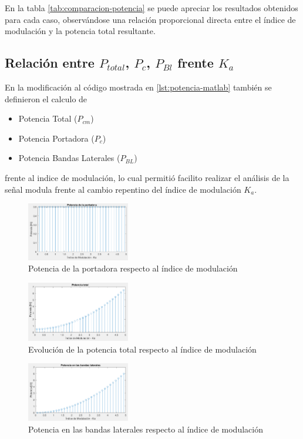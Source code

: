 \documentclass[conference]{IEEEtran}
\begin{document}
	En la tabla \ref{tab:comparacion-potencia} se puede apreciar los resultados obtenidos para cada caso, observándose una relación proporcional directa entre el índice de modulación y la potencia total resultante.
	
	\subsection{\textbf{Relación entre $P_{total}$, $P_c$, $P_{Bl}$ frente $K_a$}}
	
	En la modificación al código mostrada en \ref{lst:potencia-matlab} también se definieron el calculo de 
	\begin{itemize}
		\item Potencia Total ($P_{cm}$)
		\item Potencia Portadora ($P_c$)
		\item Potencia Bandas Laterales ($P_{BL}$)
	\end{itemize}
	
	frente al indice de modulación, lo cual permitió facilito realizar el análisis de la señal modula frente al cambio repentino del índice de modulación $K_a$.
	
	\begin{figure}[h]
		\centering
		\includegraphics[width=0.4\textwidth]{media/potencia-portadora}
		\caption{Potencia de la portadora respecto al índice de modulación}
		\label{fig:potencia-portadora}
	\end{figure}
	
	\begin{figure}[h]
		\centering
		\includegraphics[width=0.4\textwidth]{media/potencia-total}
		\caption{Evolución de la potencia total respecto al índice de modulación}
		\label{fig:potencia-total}
	\end{figure}
	
	\begin{figure}[h]
		\centering
		\includegraphics[width=0.4\textwidth]{media/potencia-laterales}
		\caption{Potencia en las bandas laterales respecto al índice de modulación}
		\label{fig:potencia-laterales}
	\end{figure}
	
\end{document}
